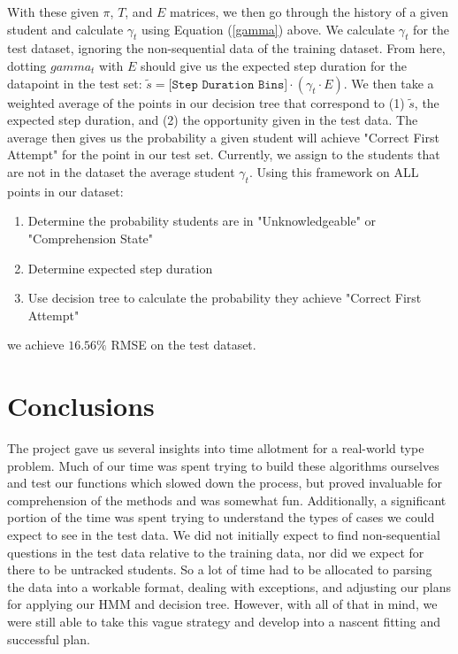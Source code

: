 \documentclass{article} %
\begin{document}
With these given $\pi$, $T$, and $E$ matrices, we then go through the history of a given student and calculate $\gamma_t$ using Equation (\ref{gamma}) above. We calculate $\gamma_t$ for the test dataset, ignoring the non-sequential data of the training dataset. From here, dotting $gamma_t$ with $E$ should give us the expected step duration for the datapoint in the test set: $\tilde{s} = \texttt{[Step Duration Bins]} \cdot (\gamma_t \cdot E)$. We then take a weighted average of the points in our decision tree that correspond to (1) $\tilde{s}$, the expected step duration, and (2) the opportunity given in the test data. The average then gives us the probability a given student will achieve "Correct First Attempt" for the point in our test set. Currently, we assign to the students that are not in the dataset the average student $\gamma_t$. Using this framework on ALL points in our dataset:
\begin{enumerate}
\item Determine the probability students are in "Unknowledgeable" or "Comprehension State"
\item Determine expected step duration
\item Use decision tree to calculate the probability they achieve "Correct First Attempt"
\end{enumerate}
we achieve $16.56\%$ RMSE on the test dataset.

\section{Conclusions}

The project gave us several insights into time allotment for a real-world type problem. Much of our time was spent trying to build these algorithms ourselves and test our functions which slowed down the process, but proved invaluable for comprehension of the methods and was somewhat fun. Additionally, a significant portion of the time was spent trying to understand the types of cases we could expect to see in the test data. We did not initially expect to find non-sequential questions in the test data relative to the training data, nor did we expect for there to be untracked students. So a lot of time had to be allocated to parsing the data into a workable format, dealing with exceptions, and adjusting our plans for applying our HMM and decision tree. However, with all of that in mind, we were still able to take this vague strategy and develop into a nascent fitting and successful plan.
\end{document}
